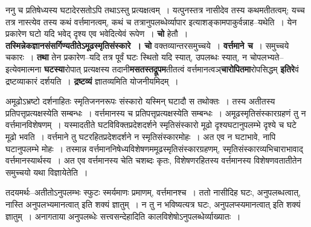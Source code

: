 \documentclass[article,12pt,a4paper]{memoir}
\begin{document}
	  \pstart ननु च प्रतिषेध्यस्य घटादेरसतोऽपि तथाऽस्तु प्रत्यक्षत्वम् । यत्पुनस्तत्र नासीदेव तस्य कथमतीतत्वम्; यच्च तत्र नास्त्येव तस्य कथं वर्त्तमानत्वम्, कथं च तत्रानुपलब्धेर्व्यापार इत्याशङ्कामपाकुर्वन्नाह--यथेति । येन प्रकारेण घटो यदि भवेद् दृश्य एव भवेदित्येवं रूपेण । \textbf{चो} हेतौ । \textbf{तस्मिन्नेकज्ञानसंसर्गिण्यतीतेऽमूढस्मृतिसंस्कारे । चो} वक्तव्यान्तरसमुच्चये । \textbf{वर्त्तमाने च} । समुच्चये चकारः । \textbf{तथा} तेन प्रकारेण--यदि तत्र पूर्वं घटः स्थितो यदि स्यात्, उपलब्धः स्यात्, न चोपलभ्यते--इत्येवमात्मना \textbf{घटस्या}रोपात् प्रत्यक्षस्य तदानी\textbf{मसतस्तद्रूपम}तीतत्वं वर्त्तमानत्वञ्\textbf{चारोपितमा}रोपसिद्धम् \textbf{इतिरे}वं द्रष्टव्याकारं दर्शयति । \textbf{द्रष्टव्यं} ज्ञातव्यमिति योजनीयमिदम् ।
	\pend
	  \bigskip
	  \begingroup
	

	  \pstart {}अमूढोऽभ्रष्टो दर्शनाहितः स्मृतिजननरूपः संस्कारो यस्मिन् घटादौ स तथोक्तः । तस्य अतीतस्य प्रतिपत्तृप्रत्यक्षस्येति सम्बन्धः । वर्त्तमानस्य च प्रतिपत्तृप्रत्यक्षस्येति सम्बन्धः । अमूढस्मृतिसंस्कारग्रहणं तु न वर्त्तमानविशेषणम् । यस्मादतीते घटविविक्तप्रदेशदर्शने स्मृतिसंस्कारो मूढो दृश्यघटानुपलम्भे दृश्ये च घटे मूढो भवति । वर्त्तमाने तु घटरहितप्रदेशदर्शने न स्मृतिसंस्कारमोहः । अत एव न घटाभावे, नापि घटानुपलम्भे मोहः । तस्मान्न वर्त्तमाननिषेध्यविशेषणममूढस्मृतिसंस्कारग्रहणम्, स्मृतिसंस्कारव्यभिचाराभावाद् वर्त्तमानस्यार्थस्य । अत एव वर्त्तमानस्य चेति चशब्दः कृतः, विशेषणरहितस्य वर्त्तमानस्य विशेषणवतातीतेन समुच्चयो यथा विज्ञायेतेति ।
	\pend
        

	  \pstart तदयमर्थः--अतीतोऽनुपलम्भः स्फुटः स्मर्यमाणः प्रमाणम्, वर्त्तमानश्च । ततो नासीदिह घटः, अनुपलब्धत्वात्, नास्ति अनुपलभ्यमानत्वात् इति शक्यं ज्ञातुम् । न तु न भविष्यत्यत्र घटः, अनुपलप्स्यमानत्वात् इति शक्यं ज्ञातुम् । अनागताया अनुपलब्धेः सत्त्वसन्देहादिति कालविशेषोऽनुपलब्धेर्व्याख्यातः ।
	\pend
      
\end{document}

